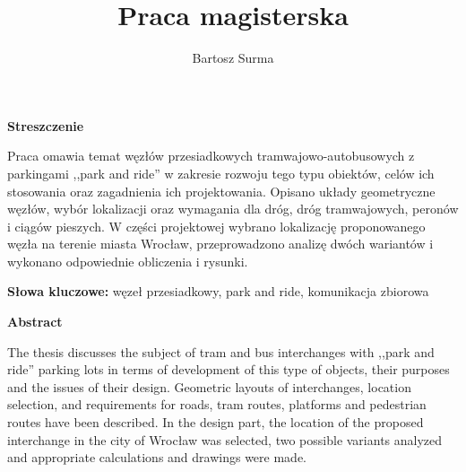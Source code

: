 \documentclass[twoside,12pt]{article}
\title{Praca magisterska}
\author{Bartosz Surma}
\date{}
\newcommand\blankpage{%
    \null
    \thispagestyle{empty}%
    \addtocounter{page}{-1}%
    \newpage}
\begin{document}

%
	
	\blankpage
	\addtocounter{page}{-1}
	\small{\tableofcontents}
	\clearpage
	\pagestyle{fancy}

\newcommand{\pnr}{,,Park and Ride''}
\newcommand{\obraz}[4]{	
	\begin{figure}[H]
		\centering
		\caption{#1}
		\texttt{[image: \#2]}\\
		\footnotesize{#3}
		{#4}
	\end{figure}
}

\newcommand{\zrodlo}[1]{\scriptsize{(#1)}}

\normalsize
{}
\textbf{Streszczenie}

Praca omawia temat węzłów przesiadkowych tramwajowo-autobusowych z parkingami ,,park and ride'' w zakresie rozwoju tego typu obiektów, celów ich stosowania oraz zagadnienia ich projektowania. Opisano układy geometryczne węzłów, wybór lokalizacji oraz wymagania dla dróg, dróg tramwajowych, peronów i ciągów pieszych. W części projektowej wybrano lokalizację proponowanego węzła na terenie miasta Wrocław, przeprowadzono analizę dwóch wariantów i wykonano odpowiednie obliczenia i rysunki.

\textbf{Słowa kluczowe:} węzeł przesiadkowy, park and ride, komunikacja zbiorowa

\vspace{3em}

\textbf{Abstract}

The thesis discusses the subject of tram and bus interchanges with ,,park and ride'' parking lots in terms of development of this type of objects, their purposes and the issues of their design. Geometric layouts of interchanges, location selection, and requirements for roads, tram routes, platforms and pedestrian routes have been described. In the design part, the location of the proposed interchange in the city of Wrocław was selected, two possible variants analyzed and appropriate calculations and drawings were made.
\end{document}
